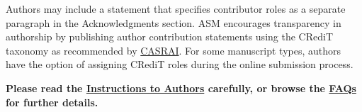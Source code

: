 \documentclass[
  lineno]{asm}
\begin{document}
Authors may include a statement that specifies contributor roles as a
separate paragraph in the Acknowledgments section. ASM encourages
transparency in authorship by publishing author contribution statements
using the CRediT taxonomy as recommended by
\href{https://casrai.org/credit/}{CASRAI}. For some manuscript types,
authors have the option of assigning CRediT roles during the online
submission process.

\textbf{Please read the
\href{https://journals.asm.org/journal/msystems/submission-review-process}{Instructions
to Authors} carefully, or browse the
\href{https://journals.asm.org/journal/msystems/faq}{FAQs} for further
details.}


  
\end{document}
